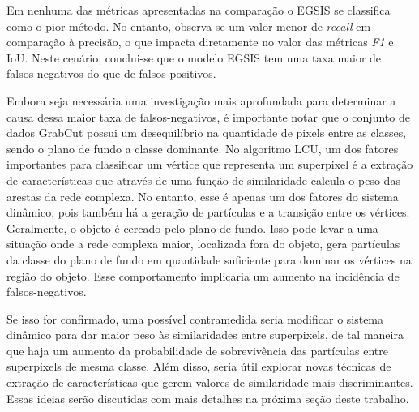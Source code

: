 Em nenhuma das métricas apresentadas na comparação o EGSIS se
classifica como o pior método. No entanto, observa-se um valor menor
de \textit{recall} em comparação à precisão, o que impacta diretamente
no valor das métricas \textit{F1} e IoU. Neste cenário, conclui-se que
o modelo EGSIS tem uma taxa maior de falsos-negativos do que de
falsos-positivos.

Embora seja necessária uma investigação mais aprofundada para
determinar a causa dessa maior taxa de falsos-negativos, é importante
notar que o conjunto de dados GrabCut possui um desequilíbrio na
quantidade de pixels entre as classes, sendo o plano de fundo a classe
dominante. No algoritmo \gls{LCU}, um dos fatores importantes para
classificar um vértice que representa um superpixel é a extração de
características que através de uma função de similaridade calcula o
peso das arestas da rede complexa. No entanto, esse é apenas um dos
fatores do sistema dinâmico, pois também há a geração de partículas e
a transição entre os vértices. Geralmente, o objeto é cercado pelo
plano de fundo. Isso pode levar a uma situação onde a rede complexa
maior, localizada fora do objeto, gera partículas da classe do plano
de fundo em quantidade suficiente para dominar os vértices na região
do objeto. Esse comportamento implicaria um aumento na incidência de
falsos-negativos.

Se isso for confirmado, uma possível contramedida seria modificar o
sistema dinâmico para dar maior peso às similaridades entre
superpixels, de tal maneira que haja um aumento da probabilidade
de sobrevivência das partículas entre superpixels de mesma
classe. Além disso, seria útil explorar novas técnicas de extração de
características que gerem valores de similaridade mais
discriminantes. Essas ideias serão discutidas com mais detalhes na
próxima seção deste trabalho.
